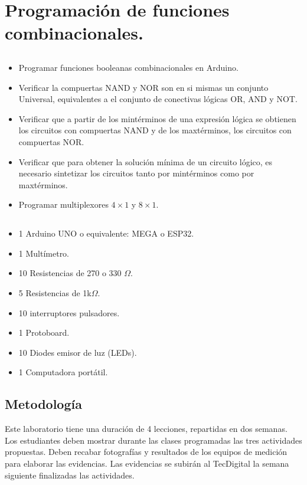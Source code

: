 \chapter{Programación de funciones combinacionales.}

\section{\obj}
\capacidad
\begin{itemize}
    \item  Programar funciones booleanas combinacionales en Arduino.
    \item  Verificar la compuertas NAND y NOR son en si mismas un conjunto Universal, equivalentes a el conjunto de conectivas lógicas OR, AND y NOT.
    \item Verificar que a partir de los mintérminos de una expresión lógica se obtienen los circuitos con compuertas NAND y de los maxtérminos, los circuitos con compuertas NOR.
    \item Verificar que para obtener la solución mínima de un circuito lógico, es necesario sintetizar los circuitos tanto por mintérminos como por maxtérminos. 
    \item Programar multiplexores $4\times1$ y $8\times1$.
\end{itemize} 


\section{\mat}
\begin{itemize}
    \item 1 Arduino UNO o equivalente: MEGA o ESP32.
    \item 1 Multímetro.
    \item 10 Resistencias de 270 o 330 $\Omega$.
    \item 5 Resistencias de 1k$\Omega$.
    \item 10 interruptores pulsadores.
    \item 1 Protoboard.
    \item 10 Diodes emisor de luz (LEDs).
    \item 1 Computadora portátil.
\end{itemize} 

\section{Metodología}

Este laboratorio tiene una duración de 4 lecciones, repartidas en dos semanas. Los estudiantes deben mostrar durante las clases programadas las tres actividades propuestas. Deben recabar fotografías y resultados de los equipos de medición para elaborar las evidencias. Las evidencias se subirán al TecDigital la semana siguiente finalizadas las actividades.

